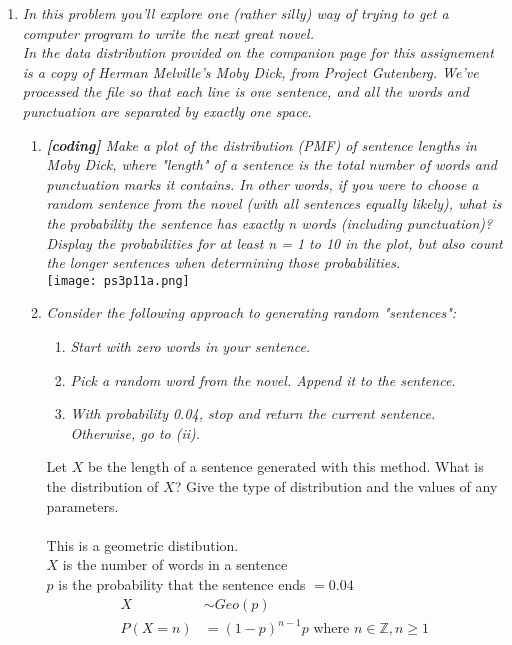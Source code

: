 \documentclass{article} %
\begin{document}
\begin{enumerate}
	\item \textit{In this problem you'll explore one (rather silly) way of trying to get a computer program to write the next great novel.\\
	In the data distribution provided on the companion page for this assignement is a copy of Herman Melville's Moby Dick, from Project Gutenberg. We've processed the file so that each line is one sentence, and all the words and punctuation are separated by exactly one space.}
	\begin{enumerate}
		\item \textit{\textbf{[coding]} Make a plot of the distribution (PMF) of sentence lengths in Moby Dick, where "length" of a sentence is the total number of words and punctuation marks it contains. In other words, if you were to choose a random sentence from the novel (with all sentences equally likely), what is the probability the sentence has exactly n words (including punctuation)? Display the probabilities for at least n = 1 to 10 in the plot, but also count the longer sentences when determining those probabilities.}\\
		\texttt{[image: ps3p11a.png]}
		
		\item \textit{Consider the following approach to generating random "sentences":}
			\begin{enumerate}
				\item \textit{Start with zero words in your sentence.}
				\item \textit{Pick a random word from the novel. Append it to the sentence.}
				\item \textit{With probability 0.04, stop and return the current sentence. Otherwise, go to (ii).}			
			\end{enumerate}
			Let $X$ be the length of a sentence generated with this method. What is the distribution of $X$? Give the type of distribution and the values of any parameters.\\
		\\
		This is a geometric distibution.\\
		$X$ is the number of words in a sentence\\
		$p$ is the probability that the sentence ends $= 0.04$
		\begin{align*}
		X &\sim Geo(p)\\
		P(X = n) &= (1 - p)^{n - 1}p \text{ where } n \in \mathbb{Z}, n \geq 1
		\end{align*}
			

\end{enumerate}
\end{enumerate}
\end{document}
